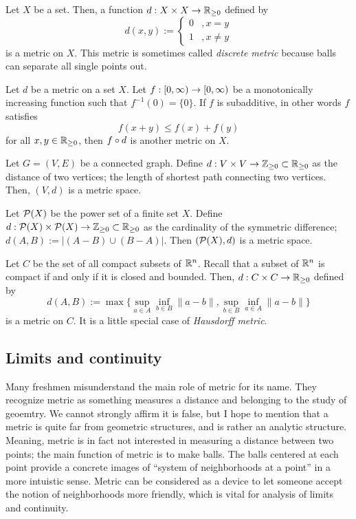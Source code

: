 \documentclass{../crs}
\begin{document}
\begin{ex}\label{ex:discrete metric}
Let $X$ be a set.
Then, a function $d:X\x X\to\R_{\ge0}$ defined by
\[d(x,y):=\begin{cases}0&,x=y\\1&,x\ne y\end{cases}\]
is a metric on $X$.
This metric is sometimes called \emph{discrete metric} because balls can separate all single points out.
\end{ex}
\begin{ex}\label{ex:subadditive function metric}
Let $d$ be a metric on a set $X$.
Let $f:[0,\oo)\to[0,\oo)$ be a monotonically increasing function such that $f^{-1}(0)=\{0\}$.
If $f$ is subadditive, in other words $f$ satisfies
\[f(x+y)\le f(x)+f(y)\]
for all $x,y\in\mathbb{R}_{\ge0}$, then $f\circ d$ is another metric on $X$.
\end{ex}
\begin{ex}
Let $G=(V,E)$ be a connected graph.
Define $d:V\x V\to\Z_{\ge0}\subset\R_{\ge0}$ as the distance of two vertices; the length of shortest path connecting two vertices.
Then, $(V,d)$ is a metric space.
\end{ex}
\begin{ex}
Let $\mathcal{P}(X)$ be the power set of a finite set $X$.
Define $d:\cP(X)\x\cP(X)\to\Z_{\ge0}\subset\R_{\ge0}$ as the cardinality of the symmetric difference; $d(A,B):=|(A-B)\cup(B-A)|$.
Then $(\mathcal{P}(X),d)$ is a metric space.
\end{ex}
\begin{ex}
Let $C$ be the set of all compact subsets of $\mathbb{R}^n$.
Recall that a subset of $\mathbb{R}^n$ is compact if and only if it is closed and bounded.
Then, $d:C\x C\to\R_{\ge0}$ defined by
\[d(A,B):=\max\{\sup_{a\in A}\inf_{b\in B}\|a-b\|,\sup_{b\in B}\inf_{a\in A}\|a-b\|\}\]
is a metric on $C$.
It is a little special case of \emph{Hausdorff metric}.
\end{ex}



\subsection{Limits and continuity}

Many freshmen misunderstand the main role of metric for its name.
They recognize metric as something measures a distance and belonging to the study of geoemtry.
We cannot strongly affirm it is false, but I hope to mention that a metric is quite far from geometric structures, and is rather an analytic structure.
Meaning, metric is in fact not interested in measuring a distance between two points; the main function of metric is to make balls.
The balls centered at each point provide a concrete images of ``system of neighborhoods at a point'' in a more intuistic sense.
Metric can be considered as a device to let someone accept the notion of neighborhoods more friendly, which is vital for analysis of limits and continuity.
\end{document}
